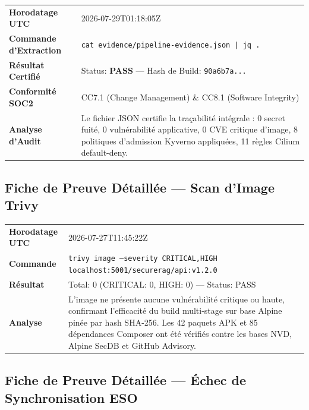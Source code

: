 \begin{tcolorbox}[colback=LightGray!30, colframe=clrBlue, arc=3pt,
    title={\small\bfseries Preuve d'Audit \#13 — Certificat de Traçabilité Intégrale (Evidence JSON)}]
\footnotesize
\begin{tabular}{@{}p{3.2cm}p{10cm}@{}}
\textbf{Horodatage UTC} & 2026-07-29T01:18:05Z \\
\textbf{Commande d'Extraction} & \texttt{cat evidence/pipeline-evidence.json | jq .} \\
\textbf{Résultat Certifié} & Status: \textbf{PASS} — Hash de Build: \texttt{90a6b7a...} \\
\textbf{Conformité SOC2} & CC7.1 (Change Management) \& CC8.1 (Software Integrity) \\
\textbf{Analyse d'Audit} & Le fichier JSON certifie la traçabilité intégrale : 0 secret fuité, 0 vulnérabilité applicative, 0 CVE critique d'image, 8 politiques d'admission Kyverno appliquées, 11 règles Cilium default-deny. \\
\end{tabular}
\end{tcolorbox}

\subsection{Fiche de Preuve Détaillée — Scan d'Image Trivy}

\begin{tcolorbox}[colback=LightGray, colframe=clrBlue,
    title={\small\bfseries Preuve \#5 — Scan Trivy Image conteneur}]
\footnotesize
\begin{tabular}{@{}p{3cm}p{10cm}@{}}
\textbf{Horodatage UTC} & 2026-07-27T11:45:22Z \\
\textbf{Commande} & \texttt{trivy image --severity CRITICAL,HIGH localhost:5001/securerag/api:v1.2.0} \\
\textbf{Résultat} & Total: 0 (CRITICAL: 0, HIGH: 0) — Status: PASS \\
\textbf{Analyse} & L'image ne présente aucune vulnérabilité critique ou haute, confirmant l'efficacité du build multi-stage sur base Alpine pinée par hash SHA-256. Les 42 paquets APK et 85 dépendances Composer ont été vérifiés contre les bases NVD, Alpine SecDB et GitHub Advisory. \\
\end{tabular}
\end{tcolorbox}

\subsection{Fiche de Preuve Détaillée — Échec de Synchronisation ESO}

